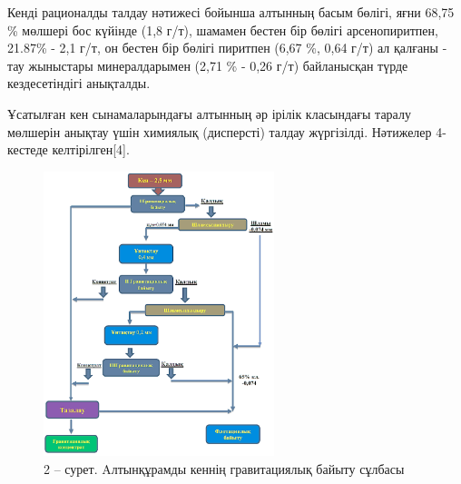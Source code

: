 \begin{multicols}{2}

Кенді рационалды талдау нәтижесі бойынша алтынның басым бөлігі, яғни
68,75 \% мөлшері бос күйінде (1,8 г/т), шамамен бестен бір бөлігі
арсенопиритпен, 21.87\% - 2,1 г/т, он бестен бір бөлігі пиритпен (6,67
\%, 0,64 г/т) ал қалғаны - тау жыныстары минералдарымен (2,71 \% - 0,26
г/т) байланысқан түрде кездесетіндігі анықталды.

Ұсатылған кен сынамаларындағы алтынның әр ірілік класындағы таралу
мөлшерін анықтау үшін химиялық (дисперсті) талдау жүргізілді. Нәтижелер
4-кестеде келтірілген{[}4{]}.
\end{multicols}


\begin{figure}[H]
	\centering
	\includegraphics[width=0.6\textwidth]{media/gor/image4}
	\caption*{2 -- сурет. Aлтынқұрамды кеннің гравитациялық байыту сұлбасы}
\end{figure}

